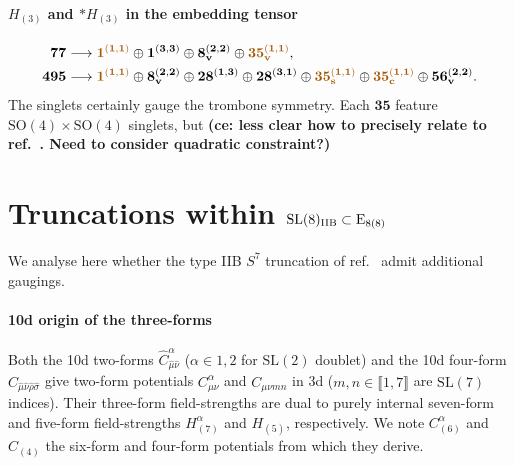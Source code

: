 \documentclass[11pt]{article}
\newcommand{\SO}{\ensuremath{\mathrm{SO}}\xspace}
\newcommand{\SL}{\ensuremath{\mathrm{SL}}\xspace}
\newcommand{\E}{\ensuremath{\mathrm{E}}\xspace}
\newcommand{\ce}[1]{\marginpar{\parbox{\marginparwidth}{\boldmath $\Longleftarrow$}}
{\boldmath\bfseries (ce: #1)}}
\begin{document}
  \paragraph{\boldmath $H_{(3)}$ and $*H_{(3)}$ in the embedding tensor}
  \begin{equation}
    \begin{aligned}
      \bm{77} &\longrightarrow {\color{mydarkorange}\bm{1}^{(\bm{1},\bm{1})}} \oplus \bm{1}^{(\bm{3},\bm{3})} \oplus \bm{8_{\rm v}}^{(\bm{2},\bm{2})} \oplus {\color{mydarkorange}\bm{35_{\rm v}}^{(\bm{1},\bm{1})}},\\
      \bm{495} &\longrightarrow {\color{mydarkorange}\bm{1}^{(\bm{1},\bm{1})}} \oplus \bm{8_{\rm v}}^{(\bm{2},\bm{2})} \oplus \bm{28}^{(\bm{1},\bm{3})} \oplus \bm{28}^{(\bm{3},\bm{1})} \oplus {\color{mydarkorange}\bm{35_{\rm s}}^{(\bm{1},\bm{1})}} \oplus {\color{mydarkorange}\bm{35_{\rm c}}^{(\bm{1},\bm{1})}} \oplus \bm{56_{\rm v}}^{(\bm{2},\bm{2})}.
    \end{aligned}
  \end{equation}
  The singlets certainly gauge the trombone symmetry. Each $\bm{35}$ feature $\SO(4)\times\SO(4)$ singlets, but \ce{less clear how to precisely relate to ref.~\cite{Eloy:2021fhc}. Need to consider quadratic constraint?}

  


\section{Truncations within \texorpdfstring{$\SL(8)_{\rm IIB}\subset\E_{8(8)}$}{SL(8)IIB in E8(8)}}
We analyse here whether the type IIB $S^{7}$ truncation of ref.~\cite{Galli:2022idq} admit additional gaugings.

\paragraph{10d origin of the three-forms} Both the 10d two-forms $\hat{C}_{\hat\mu\hat\nu}^{\alpha}$ ($\alpha\in{1,2}$ for $\SL(2)$ doublet) and the 10d four-form $\hat{C}_{\hat\mu\hat\nu\hat\rho\hat\sigma}$ give two-form potentials $C^{\alpha}_{\mu\nu}$ and $C_{\mu\nu mn}$ in 3d ($m,n\in\llbracket1,7\rrbracket$ are $\SL(7)$ indices). Their three-form field-strengths are dual to purely internal seven-form and five-form field-strengths $H_{(7)}^{\alpha}$ and $H_{(5)}$, respectively. We note $C_{(6)}^{\alpha}$ and $C_{(4)}$ the six-form and four-form potentials from which they derive.
\end{document}
